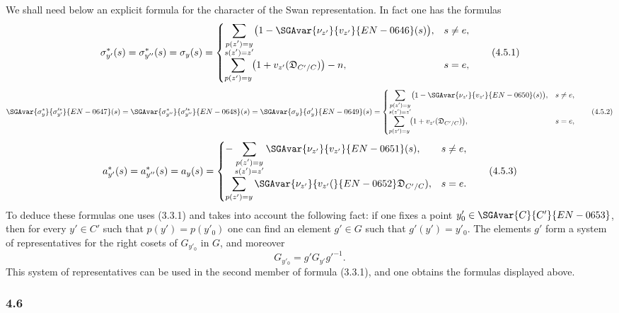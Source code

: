 We shall need below an explicit formula for the character of the Swan representation. In fact one has the formulas
\[
\sigma^{*}_{y'}(s)=\sigma^{*}_{y''}(s)=\sigma_y(s)=
\begin{cases}
\displaystyle\sum_{\substack{p(z')=y\\s(z')=z'}}\bigl(1-\SGAvar{\nu_{z'}}{v_{z'}}{EN-0646}(s)\bigr),& s\ne e,\\[0.8em]
\displaystyle\sum_{p(z')=y}\bigl(1+v_{z'}(\mathfrak D_{C'/C})\bigr)-n,& s=e,
\end{cases}
\tag{4.5.1}
\]
\[
\SGAvar{\sigma^{*}_{y}}{\sigma^{\prime*}_{y'}}{EN-0647}(s)=\SGAvar{\sigma^{*}_{y''}}{\sigma^{\prime*}_{y''}}{EN-0648}(s)=\SGAvar{\sigma_y}{\sigma'_y}{EN-0649}(s)=
\begin{cases}
\displaystyle\sum_{\substack{p(z')=y\\s(z')=z'}}\bigl(1-\SGAvar{\nu_{z'}}{v_{z'}}{EN-0650}(s)\bigr),& s\ne e,\\[0.8em]
\displaystyle\sum_{p(z')=y}\bigl(1+v_{z'}(\mathfrak D_{C'/C})\bigr),& s=e,
\end{cases}
\tag{4.5.2}
\]
\[
a^{*}_{y'}(s)=a^{*}_{y''}(s)=a_y(s)=
\begin{cases}
\displaystyle-\sum_{\substack{p(z')=y\\s(z')=z'}}\SGAvar{\nu_{z'}}{v_{z'}}{EN-0651}(s),& s\ne e,\\[0.8em]
\displaystyle\sum_{p(z')=y}\SGAvar{\nu_{z'}}{v_{z'}(}{EN-0652}\mathfrak D_{C'/C}),& s=e.
\end{cases}
\tag{4.5.3}
\]
To deduce these formulas one uses (3.3.1) and takes into account the following fact: if one fixes a point $y'_0\in \SGAvar{C}{C'}{EN-0653}$, then for every $y'\in C'$ such that $p(y')=p(y'_0)$ one can find an element $g'\in G$ such that $g'(y')=y'_0$. The elements $g'$ form a system of representatives for the right cosets of $G_{y'_0}$ in $G$, and moreover
\[
G_{y'_0}=g'G_{y'}g'^{-1}.
\]
This system of representatives can be used in the second member of formula (3.3.1), and one obtains the formulas displayed above.

\subsubsection*{4.6}

